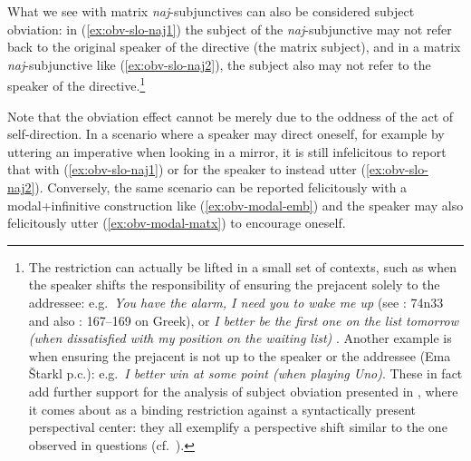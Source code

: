 \documentclass[output=paper,colorlinks,citecolor=brown]{langscibook}
\begin{document}
\noindent What we see with matrix \emph{naj}-subjunctives can also be considered subject obviation: in (\ref{ex:obv-slo-naj1}) the subject of the \emph{naj}-subjunctive may not refer back to the original speaker of the directive (the matrix subject), and in a matrix \emph{naj}-subjunctive like (\ref{ex:obv-slo-naj2}), the subject also may not refer to the speaker of the directive.\footnote{\label{ftn:obv-obv}The restriction can actually be lifted in a small set of contexts, such as when the speaker shifts the responsibility of ensuring the prejacent solely to the addressee: e.g.\ \emph{You have the alarm, I need you to wake me up} (see \cite{stegovec19}: 74n33 and also \cite{oikonomou16}: 167–169 on Greek), or \emph{I better be the first one on the list tomorrow (when dissatisfied with my position on the waiting
list)} \citep[][16]{kaufmannetal23}. Another example is when ensuring the prejacent is not up to the speaker or the addressee (Ema \v{S}tarkl p.c.): e.g.\ \emph{I better win at some point (when playing Uno)}. These in fact add further support for the analysis of subject obviation presented in , where it comes about as a binding restriction against a syntactically present perspectival center: they all exemplify a perspective shift similar to the one observed in questions (cf.~).}

\z

\noindent Note that the obviation effect cannot be merely due to the oddness of the act of self-direction. In a scenario where a speaker may direct oneself, for example by uttering an imperative when looking in a mirror, it is still infelicitous to report that with (\ref{ex:obv-slo-naj1}) or for the speaker to instead utter (\ref{ex:obv-slo-naj2}). Conversely, the same scenario can be reported felicitously with a modal+infinitive construction like (\ref{ex:obv-modal-emb}) and the speaker may also felicitously utter (\ref{ex:obv-modal-matx}) to encourage oneself. 

\ea {}
\z\z
\end{document}
